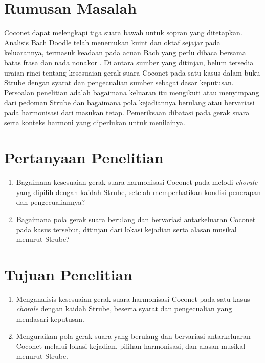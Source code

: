 \section{Rumusan Masalah}\label{sec:rumusan-masalah}

Coconet dapat melengkapi tiga suara bawah untuk sopran yang ditetapkan. Analisis Bach Doodle telah menemukan kuint dan oktaf sejajar pada keluarannya, termasuk keadaan pada acuan Bach yang perlu dibaca bersama batas frasa dan nada nonakor \parencite[798]{huang2019}. Di antara sumber yang ditinjau, belum tersedia uraian rinci tentang kesesuaian gerak suara Coconet pada satu kasus dalam buku Strube dengan syarat dan pengecualian sumber sebagai dasar keputusan. Persoalan penelitian adalah bagaimana keluaran itu mengikuti atau menyimpang dari pedoman Strube dan bagaimana pola kejadiannya berulang atau bervariasi pada harmonisasi dari masukan tetap. Pemeriksaan dibatasi pada gerak suara serta konteks harmoni yang diperlukan untuk menilainya.

\section{Pertanyaan Penelitian}\label{sec:pertanyaan-penelitian}

\begin{enumerate}
    \item Bagaimana kesesuaian gerak suara harmonisasi Coconet pada melodi \textit{chorale} yang dipilih dengan kaidah Strube, setelah memperhatikan kondisi penerapan dan pengecualiannya?
    \item Bagaimana pola gerak suara berulang dan bervariasi antarkeluaran Coconet pada kasus tersebut, ditinjau dari lokasi kejadian serta alasan musikal menurut Strube?
\end{enumerate}

\section{Tujuan Penelitian}\label{sec:tujuan-penelitian}

\begin{enumerate}
    \item Menganalisis kesesuaian gerak suara harmonisasi Coconet pada satu kasus \textit{chorale} dengan kaidah Strube, beserta syarat dan pengecualian yang mendasari keputusan.
    \item Menguraikan pola gerak suara yang berulang dan bervariasi antarkeluaran Coconet melalui lokasi kejadian, pilihan harmonisasi, dan alasan musikal menurut Strube.
\end{enumerate}

